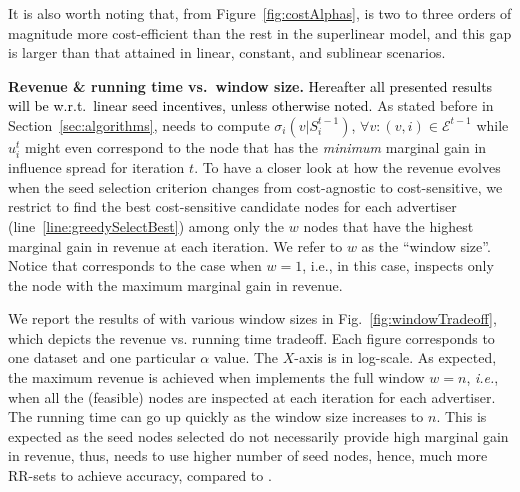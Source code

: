 It is also worth noting that, from Figure~\ref{fig:costAlphas}, \fastcs is two to three orders of magnitude more cost-efficient than the rest in the superlinear model, and this gap is larger than that attained in linear, constant, and sublinear scenarios.







\smallskip\noindent\textbf{Revenue \& running time vs.\ window size.}
\textcolor{black}{Hereafter all presented results will be w.r.t.\ linear seed incentives, unless otherwise noted.}
As stated before in Section~\ref{sec:algorithms}, \fastcs needs to compute $\sigma_i(v | S^{t-1}_i)$, $\forall v : (v,i) \in \mathcal{E}^{t-1}$ while $u_i^{t}$ might even correspond to the node that has the \emph{minimum} marginal gain in influence spread for iteration $t$.
To have a closer look at how the revenue evolves when the seed selection criterion changes from cost-agnostic to cost-sensitive, we restrict  \fastcs to find the best cost-sensitive candidate nodes for each advertiser (line~\ref{line:greedySelectBest}) among only the $w$ nodes that have the highest marginal gain in revenue at each iteration. We refer to $w$ as the ``window size''.
Notice that \fastca corresponds to the case when $w=1$, i.e., in this case,  \fastcs inspects only the node with the maximum marginal gain in revenue.

We report the results of \fastcs with various window sizes in Fig.~\ref{fig:windowTradeoff}, which depicts the revenue vs. running time tradeoff.
Each figure corresponds to one dataset and one particular $\alpha$ value.
The $X$-axis is in log-scale.
As expected, the maximum revenue is achieved when \fastcs implements the full window $w = n$, \emph{i.e.}, when all the (feasible) nodes are inspected at each iteration for each advertiser.
The running time can go up quickly as the window size increases to $n$.
This is expected as the seed nodes selected do not necessarily provide high marginal gain in revenue, thus, \fastcs needs to use higher number of seed nodes, hence, much more RR-sets to achieve accuracy, compared to \fastca.

